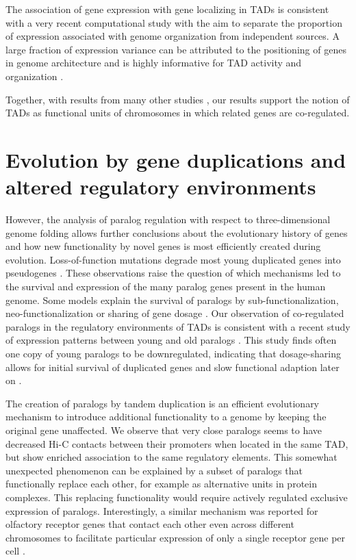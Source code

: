 \documentclass[a4paper,twoside=true,openright,parskip=full,chapterprefix=true,11pt,headings=normal,bibliography=totoc,listof=totoc,titlepage=on,captions=tableabove,draft=false]{scrreprt}
\theoremstyle{definition}
\theoremstyle{definition}
\theoremstyle{definition}
\theoremstyle{remark}
\begin{document}
The association of gene expression with gene localizing in TADs is
consistent with a very recent computational study with the aim to
separate the proportion of expression associated with genome
organization from independent sources. A large fraction of expression
variance can be attributed to the positioning of genes in genome
architecture and is highly informative for TAD activity and organization
\citep{Rennie2018}.

Together, with results from many other studies
\citep{Bonev2016, Andrey2017, Hnisz2016a}, our results support the
notion of TADs as functional units of chromosomes in which related genes
are co-regulated.

\hypertarget{evolution-by-gene-duplications-and-altered-regulatory-environments}{%
\section{Evolution by gene duplications and altered regulatory
environments}\label{evolution-by-gene-duplications-and-altered-regulatory-environments}}

However, the analysis of paralog regulation with respect to
three-dimensional genome folding allows further conclusions about the
evolutionary history of genes and how new functionality by novel genes
is most efficiently created during evolution. Loss-of-function mutations
degrade most young duplicated genes into pseudogenes \citep{Lynch2003}.
These observations raise the question of which mechanisms led to the
survival and expression of the many paralog genes present in the human
genome. Some models explain the survival of paralogs by
sub-functionalization, neo-functionalization or sharing of gene dosage
\citep{Innan2010}. Our observation of co-regulated paralogs in the
regulatory environments of TADs is consistent with a recent study of
expression patterns between young and old paralogs \citep{Lan2016}. This
study finds often one copy of young paralogs to be downregulated,
indicating that dosage-sharing allows for initial survival of duplicated
genes and slow functional adaption later on \citep{Lan2016}.

The creation of paralogs by tandem duplication is an efficient
evolutionary mechanism to introduce additional functionality to a genome
by keeping the original gene unaffected. We observe that very close
paralogs seems to have decreased Hi-C contacts between their promoters
when located in the same TAD, but show enriched association to the same
regulatory elements. This somewhat unexpected phenomenon can be
explained by a subset of paralogs that functionally replace each other,
for example as alternative units in protein complexes. This replacing
functionality would require actively regulated exclusive expression of
paralogs. Interestingly, a similar mechanism was reported for olfactory
receptor genes that contact each other even across different chromosomes
to facilitate particular expression of only a single receptor gene per
cell \citep{Monahan2015, Monahan2017}.
\end{document}
